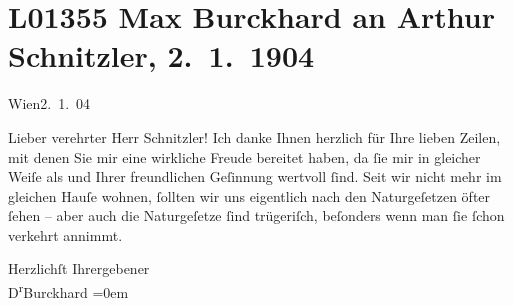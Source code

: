 

\section[Max Burckhard an Arthur Schnitzler, 2. 1. 1904]{L01355 Max Burckhard an Arthur Schnitzler, 2. 1. 1904}
\nopagebreak{}
\rehead{ }\normalsize\beginnumbering{}
\toendnotes[C]{\smallbreak\pagebreak[2]}
\toendnotes[C]{\smallbreak}
\toendnotes[C]{\smallbreak}
\pstart
           \raggedleft{}{\pb}Wien2. 1. 04\pend
           
\pstart{}Lieber verehrter Herr Schnitzler!\pend\vspace{0.5em}
\pstart
           Ich danke Ihnen herzlich für Ihre lieben Zeilen, mit denen Sie mir eine wirkliche
               Freude bereitet haben, da{ }ſie mir in gleicher Weiſe als \label{K_L01355-1v}\label{K_L01355-1} und Ihrer freundlichen Geſinnung wertvoll{ }ſind.
               Seit wir nicht mehr im gleichen Hauſe wohnen,{ }ſollten wir uns eigentlich nach den
               Naturgeſetzen öfter{ }ſehen – aber {\pb}auch die
               Naturgeſetze{ }ſind trügeriſch, beſonders wenn man{ }ſie{ }ſchon verkehrt annimmt.\pend
           
\pstart
           Herzlichſt Ihr\hspace*{1.5em}ergebener{\\[\baselineskip]}\spacefill\mbox{D\textsuperscript{r}Burckhard}\pend
           \leftskip=0em{}\endnumbering{}  \newcommand{\dateiname}{L01355}\newcommand{\titel}{Max Burckhard an Arthur Schnitzler, 2. 1. 1904}\newcommand{\editorInnen}{Martin Anton Müller und Gerd-Hermann Susen}
